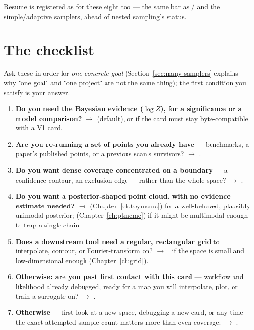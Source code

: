 Resume is registered as  for these eight too --- the same bar as
/ and the simple/adaptive samplers, ahead of nested
sampling's  status.

\section{The checklist}
\label{sec:decision-table}

Ask these in order for \emph{one concrete goal} (Section~\ref{sec:many-samplers}
explains why "one goal" and "one project" are not the same thing); the first
condition you satisfy is your answer.

\begin{enumerate}
  \item \textbf{Do you need the Bayesian evidence ($\log Z$), for a significance or a
        model comparison?} $\rightarrow$  (default), or
         if the card must stay byte-compatible with a V1
         card.
  \item \textbf{Are you re-running a set of points you already have} ---
        benchmarks, a paper's published points, or a previous scan's survivors?
        $\rightarrow$ .
  \item \textbf{Do you want dense coverage concentrated on a boundary} --- a
        confidence contour, an exclusion edge --- rather than the whole space?
        $\rightarrow$ .
  \item \textbf{Do you want a posterior-shaped point cloud, with no evidence
        estimate needed?} $\rightarrow$  (Chapter~\ref{ch:toymcmc})
        for a well-behaved, plausibly unimodal posterior; 
        (Chapter~\ref{ch:ptmcmc}) if it might be multimodal enough to trap a single
        chain.
  \item \textbf{Does a downstream tool need a regular, rectangular grid} to
        interpolate, contour, or Fourier-transform on? $\rightarrow$ ,
        if the space is small and low-dimensional enough (Chapter~\ref{ch:grid}).
  \item \textbf{Otherwise: are you past first contact with this card} --- workflow
        and likelihood already debugged, ready for a map you will interpolate, plot,
        or train a surrogate on? $\rightarrow$ .
  \item \textbf{Otherwise} --- first look at a new space, debugging a new card, or
        any time the exact attempted-sample count matters more than even coverage:
        $\rightarrow$ .
\end{enumerate}

